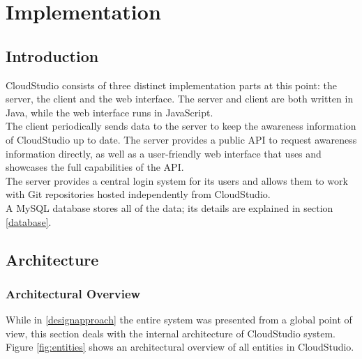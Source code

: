 

\chapter{Implementation}\label{implementation}



\section{Introduction}

CloudStudio consists of three distinct implementation parts at this point: the server, the client and the web interface. The server and client are both written in Java, while the web interface runs in JavaScript. \\

The client periodically sends data to the server to keep the awareness information of CloudStudio up to date. The server provides a public API to request awareness information directly, as well as a user-friendly web interface that uses and showcases the full capabilities of the API. \\

The server provides a central login system for its users and allows them to work with Git repositories hosted independently from CloudStudio. \\

A MySQL database stores all of the data; its details are explained in section \ref{database}.





\section{Architecture}

\subsection{Architectural Overview}

While in \ref{designapproach} the entire system was presented from a global point of view, this section deals with the internal architecture of CloudStudio system. Figure \ref{fig:entities} shows an architectural overview of all entities in CloudStudio. \\

